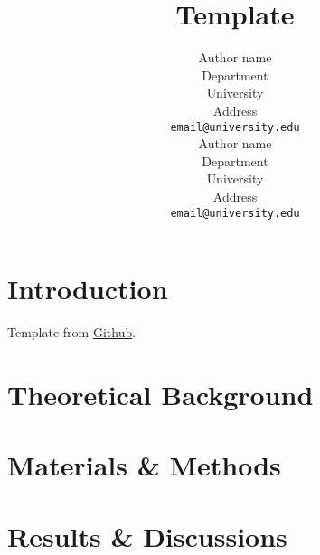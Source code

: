 \documentclass{article}
\title{Template}
\author{ 
    Author name \\
	Department \\
	University\\
	Address \\
	\texttt{email@university.edu} \\
	
	\And
    Author name \\
	Department \\
	University\\
	Address \\
	\texttt{email@university.edu} \\
}
\begin{document}
\maketitle


\begin{abstract}
	\lipsum[1]
\end{abstract}


\section{Introduction}
\label{sec:introduction}

Template from  \href{https://github.com/kourgeorge/arxiv-style}{Github}. \lipsum[1]

\section{Theoretical Background}
\label{sec:headings}

\lipsum[1]

\section{Materials \& Methods}
\label{sec:others}

\lipsum[1] \cite{kour2014real} 

\section{Results \& Discussions}
\label{sec:test}
\end{document}
